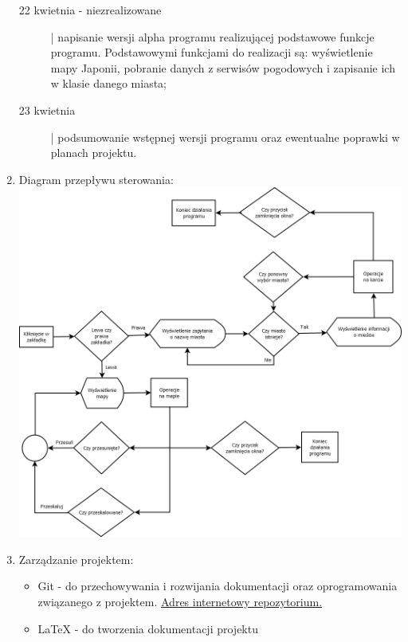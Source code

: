 \documentclass[a4paper]{article}
\begin{document}
\begin{enumerate}
\begin{description}
\item[22 kwietnia - niezrealizowane] | napisanie wersji alpha programu realizującej podstawowe funkcje programu. Podstawowymi funkcjami do realizacji są: wyświetlenie mapy Japonii, pobranie danych z serwisów pogodowych i zapisanie ich w klasie danego miasta;

\item[23 kwietnia] | podsumowanie wstępnej wersji programu oraz ewentualne poprawki w planach projektu.
\end{description}

\item Diagram przepływu sterowania:\\
\includegraphics[scale=0.4]{przeplyw.png}

\item Zarządzanie projektem:
\begin{itemize}
\item Git - do przechowywania i rozwijania dokumentacji oraz oprogramowania związanego z projektem.
\href{https://github.com/hizonglol/wds-2016}{Adres internetowy repozytorium.}
\item LaTeX - do tworzenia dokumentacji projektu
\end{itemize}
\end{enumerate}
\end{document}
